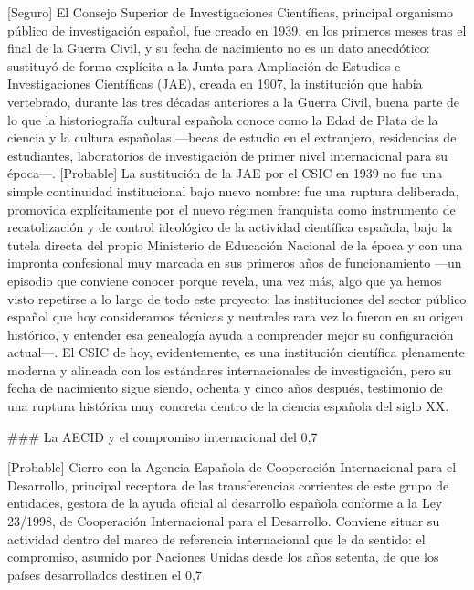 \documentclass[10pt,a4paper]{article}
\begin{document}
[Seguro] El Consejo Superior de Investigaciones Científicas, principal organismo público de investigación español, fue creado en 1939, en los primeros meses tras el final de la Guerra Civil, y su fecha de nacimiento no es un dato anecdótico: sustituyó de forma explícita a la Junta para Ampliación de Estudios e Investigaciones Científicas (JAE), creada en 1907, la institución que había vertebrado, durante las tres décadas anteriores a la Guerra Civil, buena parte de lo que la historiografía cultural española conoce como la Edad de Plata de la ciencia y la cultura españolas —becas de estudio en el extranjero, residencias de estudiantes, laboratorios de investigación de primer nivel internacional para su época—. [Probable] La sustitución de la JAE por el CSIC en 1939 no fue una simple continuidad institucional bajo nuevo nombre: fue una ruptura deliberada, promovida explícitamente por el nuevo régimen franquista como instrumento de recatolización y de control ideológico de la actividad científica española, bajo la tutela directa del propio Ministerio de Educación Nacional de la época y con una impronta confesional muy marcada en sus primeros años de funcionamiento —un episodio que conviene conocer porque revela, una vez más, algo que ya hemos visto repetirse a lo largo de todo este proyecto: las instituciones del sector público español que hoy consideramos técnicas y neutrales rara vez lo fueron en su origen histórico, y entender esa genealogía ayuda a comprender mejor su configuración actual—. El CSIC de hoy, evidentemente, es una institución científica plenamente moderna y alineada con los estándares internacionales de investigación, pero su fecha de nacimiento sigue siendo, ochenta y cinco años después, testimonio de una ruptura histórica muy concreta dentro de la ciencia española del siglo XX.

### La AECID y el compromiso internacional del 0,7%

[Probable] Cierro con la Agencia Española de Cooperación Internacional para el Desarrollo, principal receptora de las transferencias corrientes de este grupo de entidades, gestora de la ayuda oficial al desarrollo española conforme a la Ley 23/1998, de Cooperación Internacional para el Desarrollo. Conviene situar su actividad dentro del marco de referencia internacional que le da sentido: el compromiso, asumido por Naciones Unidas desde los años setenta, de que los países desarrollados destinen el 0,7%
\end{document}
